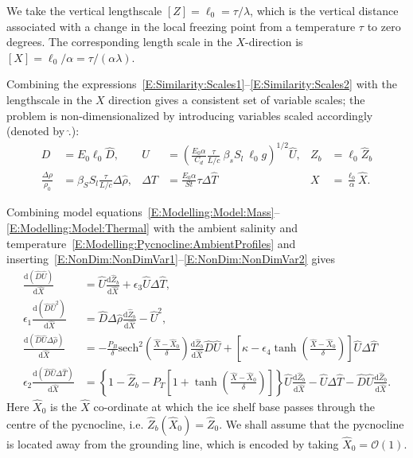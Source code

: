 \documentclass[openacc]{rsproca_new}%
\newcommand{\dd}[2]{\frac{\mathrm{d} #1}{\mathrm{d} #2}}
\newcommand{\order}[1]{\mathcal{O}(#1)}
\newcommand{\epsone}{\epsilon_{1}} %
\newcommand{\epstwo}{\epsilon_{2}} %
\newcommand{\epsthree}{\epsilon_{3}} %
\newcommand{\epsfour}{\epsilon_{4}}
\newcommand{\Pb}{\textit{P}_B}  %
\newcommand{\lt}{\delta} %
\newcommand{\Pt}{\textit{P}_T}
\begin{document}
We take the vertical lengthscale $\left[Z\right] = \ell_0= \tau / \lambda$, which is the vertical distance associated with a change in the local freezing point from a temperature $\tau$ to zero degrees. The corresponding length scale in the $X$-direction is $\left[X\right] = \ell_0 / \alpha=\tau/ (\alpha \lambda)$.

Combining the expressions~\eqref{E:Similarity:Scales1}--\eqref{E:Similarity:Scales2} with the lengthscale in the $X$ direction gives a consistent set of variable scales; the problem is non-dimensionalized by introducing variables scaled accordingly (denoted by  $\hat{.}$):
\begin{align}
D&= E_0 \ell_0 \hat{D}, & U&= \left(\frac{E_0 \alpha}{C_d} \frac{\tau}{L/c}~\beta_s S_l ~\ell_0  g\right)^{1/2}\hat{U}, & Z_b &= \ell_0 \hat{Z}_b\label{E:NonDim:NonDimVar1}\\
\frac{\Delta \rho}{\rho_0} &= \beta_S S_l \frac{\tau}{L/c}\Delta \hat{\rho}, & \Delta T &= \frac{E_0 \alpha}{St}\tau \Delta \hat{T} & X &=\frac{\ell_0}{\alpha}\hat{X}. \label{E:NonDim:NonDimVar2}
\end{align}

Combining model equations~\eqref{E:Modelling:Model:Mass}--\eqref{E:Modelling:Model:Thermal} with the ambient salinity and temperature~\eqref{E:Modelling:Pycnocline:AmbientProfiles} and inserting~\eqref{E:NonDim:NonDimVar1}--\eqref{E:NonDim:NonDimVar2} gives
\begin{align}
\dd{(\hat{D}\hat{U})}{\hat{X}} &= \hat{U} \dd{\hat{Z}_b}{\hat{X}} +\epsthree \hat{U} \Delta \hat{T},\label{E:NonDim:mass}\\
\epsone \dd{(\hat{D}\hat{U}^2)}{\hat{X}} &= \hat{D} \Delta \hat{\rho} \dd{\hat{Z}_b}{\hat{X}} - \hat{U}^2,\label{E:NonDim:mom} \\
\dd{(\hat{D}\hat{U}\Delta \hat{\rho})}{\hat{X}}  &= -\frac{\Pb}{\delta} \mathrm{sech}^2\left(\frac{\hat{X} - \hat{X}_0}{\lt}\right)\dd{\hat{Z}_b}{\hat{X}} \hat{D}\hat{U}+
 \left[\kappa - \epsfour \tanh \left(\frac{\hat{X} - \hat{X}_0}{\lt}\right) \right] \hat{U} \Delta \hat{T}\label{E:NonDim:buoyancy} \\
\epstwo \dd{(\hat{D}\hat{U}\Delta \hat{T})}{\hat{X}} &= \left\{1 - \hat{Z}_b - \Pt\left[1 + \tanh\left(\frac{\hat{X} - \hat{X}_0}{\lt}\right)\right]\right\} \hat{U}\dd{\hat{Z}_b}{\hat{X}}  - \hat{U}\Delta \hat{T}- \hat{D}\hat{U}\dd{\hat{Z}_b}{\hat{X}}.\label{E:NonDim:thermal}
 \end{align}
Here $\hat{X}_0$ is the $\hat{X}$ co-ordinate at which the ice shelf base passes through the centre of the pycnocline, i.e. $\hat{Z}_b(\hat{X}_0) = \hat{Z}_0$. We shall assume  that the pycnocline is located away from the grounding line, which is encoded by taking $\hat{X}_0 = \order{1}$.
\end{document}

